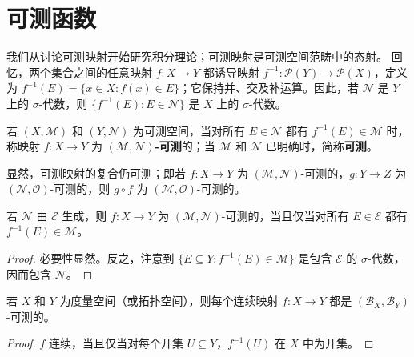 \documentclass[../../main.tex]{subfiles}%
\begin{document}
\section{可测函数}\label{section:ch02-measurable-functions}

我们从讨论可测映射开始研究积分理论；可测映射是可测空间范畴中的态射。
回忆，两个集合之间的任意映射 $f:X\to Y$ 都诱导映射 $f^{-1}:\mathscr{P}(Y)\to\mathscr{P}(X)$，定义为 $f^{-1}(E)=\{x\in X:f(x)\in E\}$；它保持并、交及补运算。因此，若 $\mathscr{N}$ 是 $Y$ 上的 $\sigma$-代数，则 $\{f^{-1}(E):E\in\mathscr{N}\}$ 是 $X$ 上的 $\sigma$-代数。

\begin{definition}[可测映射]\label{definition:ch02-measurable-map}
若 $(X,\mathscr{M})$ 和 $(Y,\mathscr{N})$ 为可测空间，当对所有 $E\in\mathscr{N}$ 都有 $f^{-1}(E)\in\mathscr{M}$ 时，称映射 $f:X\to Y$ 为 \textbf{$(\mathscr{M},\mathscr{N})$-可测}的；当 $\mathscr{M}$ 和 $\mathscr{N}$ 已明确时，简称\textbf{可测}。
\end{definition}

\begin{proposition}\label{proposition:ch02-measurable-composition}
显然，可测映射的复合仍可测；即若 $f:X\to Y$ 为 $(\mathscr{M},\mathscr{N})$-可测的，$g:Y\to Z$ 为 $(\mathscr{N},\mathscr{O})$-可测的，则 $g\circ f$ 为 $(\mathscr{M},\mathscr{O})$-可测的。
\end{proposition}

\begin{proposition}\label{proposition:ch02-measurability-generators}
若 $\mathscr{N}$ 由 $\mathscr{E}$ 生成，则 $f:X\to Y$ 为 $(\mathscr{M},\mathscr{N})$-可测的，当且仅当对所有 $E\in\mathscr{E}$ 都有 $f^{-1}(E)\in\mathscr{M}$。
\end{proposition}
\begin{proof}
必要性显然。反之，注意到 $\{E\subseteq Y:f^{-1}(E)\in\mathscr{M}\}$ 是包含 $\mathscr{E}$ 的 $\sigma$-代数，因而包含 $\mathscr{N}$。
\end{proof}

\begin{corollary}\label{corollary:ch02-continuous-borel-measurable}
若 $X$ 和 $Y$ 为度量空间（或拓扑空间），则每个连续映射 $f:X\to Y$ 都是 $(\mathscr{B}_X,\mathscr{B}_Y)$-可测的。
\end{corollary}
\begin{proof}
$f$ 连续，当且仅当对每个开集 $U\subseteq Y$，$f^{-1}(U)$ 在 $X$ 中为开集。
\end{proof}
\end{document}
